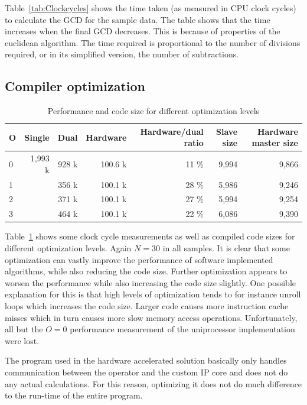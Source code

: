 \documentclass[11pt]{article}
\begin{document}
Table~\ref{tab:Clockcycles} shows the time taken (as measured in CPU clock cycles) to calculate the GCD for the sample data\cite{assignments}. The table shows that the time increases when the final GCD decreases. This is because of properties of the euclidean algorithm. The time required is proportional to the number of divisions required, or in its simplified version, the number of subtractions.

\subsection{Compiler optimization}

\begin{table}
  \centering
  \begin{tabular}{l|rrrrrr}
    \toprule
    O & Single  & Dual  & Hardware  & Hardware/dual ratio & Slave size & Hardware master size \\
    \midrule
    0 & 1,993 k & 928 k & 100.6 k & 11 \% & 9,994 & 9,866 \\
    1 &         & 356 k & 100.1 k & 28 \% & 5,986 & 9,246 \\
    2 &         & 371 k & 100.1 k & 27 \% & 5,994 & 9,254 \\
    3 &         & 464 k & 100.1 k & 22 \% & 6,086 & 9,390 \\
    \bottomrule
  \end{tabular}
  \caption{Performance and code size for different optimization levels}
  \label{tab:opt}
\end{table}

Table~\ref{tab:opt} shows some clock cycle measurements as well as compiled code sizes for different optimization levels. Again $N=30$ in all samples. It is clear that some optimization can vastly improve the performance of software implemented algorithms, while also reducing the code size. Further optimization appears to worsen the performance while also increasing the code size slightly. One possible explanation for this is that high levels of optimization tends to for instance unroll loops which increases the code size. Larger code causes more instruction cache misses which in turn causes more slow memory access operations. Unfortunately, all but the $O=0$ performance measurement of the uniprocessor implementation were lost.

The program used in the hardware accelerated solution basically only handles communication between the operator and the custom IP core and does not do any actual calculations. For this reason, optimizing it does not do much difference to the run-time of the entire program.
\end{document}
